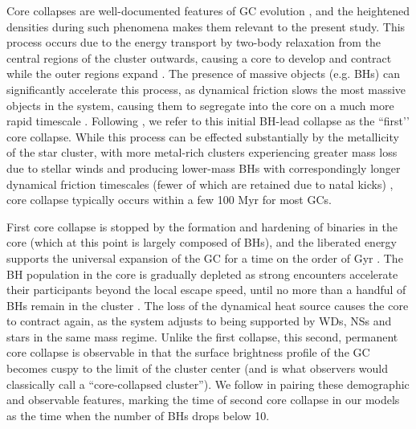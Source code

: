 \documentclass[twocolumn]{aastex631}
\begin{document}
Core collapses are well-documented features of GC evolution \citep[e.g.][]{1968MNRAS.138..495L, 2001A&A...375..711F, 2006MNRAS.368..121F, 2008gady.book.....B, 2020IAUS..351..357K}, and the heightened densities during such phenomena makes them relevant to the present study.
This process occurs due to the energy transport by two-body relaxation from the central regions of the cluster outwards, causing a core to develop and contract while the outer regions expand \citep{2003gmbp.book.....H}.
The presence of massive objects (e.g. BHs) can significantly accelerate this process, as dynamical friction slows the most massive objects in the system, causing them to segregate into the core on a much more rapid timescale \citep{2008gady.book.....B}.
Following \cite{2013MNRAS.432.2779B}, we refer to this initial BH-lead collapse as the ``first’’ core collapse.
While this process can be effected substantially by the metallicity of the star cluster, with more metal-rich clusters experiencing greater mass loss due to stellar winds and producing lower-mass BHs with correspondingly longer dynamical friction timescales (fewer of which are retained due to natal kicks) \citep{2022arXiv220316547R}, core collapse typically occurs within a few 100 Myr for most GCs. 



First core collapse is stopped by the formation and hardening of binaries in the core (which at this point is largely composed of BHs), and the liberated energy supports the universal expansion of the GC for a time on the order of Gyr \citep{2012MNRAS.420..309B}.
The BH population in the core is gradually depleted as strong encounters accelerate their participants beyond the local escape speed, until no more than a handful of BHs remain in the cluster \citep{2013MNRAS.432.2779B, 2020IAUS..351..357K}.
The loss of the dynamical heat source causes the core to contract again, as the system adjusts to being supported by WDs, NSs and stars in the same mass regime.
Unlike the first collapse, this second, permanent core collapse is observable in that the surface brightness profile of the GC becomes cuspy to the limit of the cluster center (and is what observers would classically call a ``core-collapsed cluster'').
We follow \citet{2018ApJ...855L..15K} in pairing these demographic and observable features, marking the time of second core collapse in our models as the time when the number of BHs drops below 10.
\end{document}
